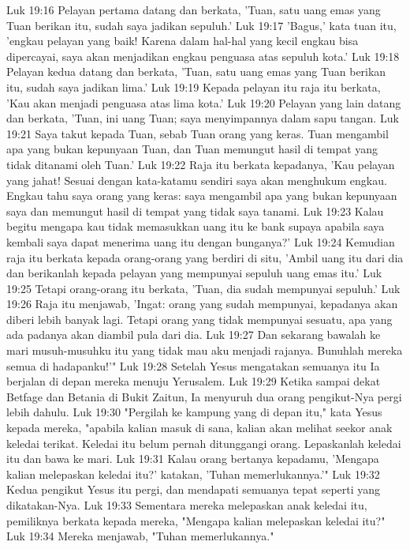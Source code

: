 Luk 19:16  Pelayan pertama datang dan berkata, 'Tuan, satu uang emas yang Tuan berikan itu, sudah saya jadikan sepuluh.'
Luk 19:17  'Bagus,' kata tuan itu, 'engkau pelayan yang baik! Karena dalam hal-hal yang kecil engkau bisa dipercayai, saya akan menjadikan engkau penguasa atas sepuluh kota.'
Luk 19:18  Pelayan kedua datang dan berkata, 'Tuan, satu uang emas yang Tuan berikan itu, sudah saya jadikan lima.'
Luk 19:19  Kepada pelayan itu raja itu berkata, 'Kau akan menjadi penguasa atas lima kota.'
Luk 19:20  Pelayan yang lain datang dan berkata, 'Tuan, ini uang Tuan; saya menyimpannya dalam sapu tangan.
Luk 19:21  Saya takut kepada Tuan, sebab Tuan orang yang keras. Tuan mengambil apa yang bukan kepunyaan Tuan, dan Tuan memungut hasil di tempat yang tidak ditanami oleh Tuan.'
Luk 19:22  Raja itu berkata kepadanya, 'Kau pelayan yang jahat! Sesuai dengan kata-katamu sendiri saya akan menghukum engkau. Engkau tahu saya orang yang keras: saya mengambil apa yang bukan kepunyaan saya dan memungut hasil di tempat yang tidak saya tanami.
Luk 19:23  Kalau begitu mengapa kau tidak memasukkan uang itu ke bank supaya apabila saya kembali saya dapat menerima uang itu dengan bunganya?'
Luk 19:24  Kemudian raja itu berkata kepada orang-orang yang berdiri di situ, 'Ambil uang itu dari dia dan berikanlah kepada pelayan yang mempunyai sepuluh uang emas itu.'
Luk 19:25  Tetapi orang-orang itu berkata, 'Tuan, dia sudah mempunyai sepuluh.'
Luk 19:26  Raja itu menjawab, 'Ingat: orang yang sudah mempunyai, kepadanya akan diberi lebih banyak lagi. Tetapi orang yang tidak mempunyai sesuatu, apa yang ada padanya akan diambil pula dari dia.
Luk 19:27  Dan sekarang bawalah ke mari musuh-musuhku itu yang tidak mau aku menjadi rajanya. Bunuhlah mereka semua di hadapanku!'"
Luk 19:28  Setelah Yesus mengatakan semuanya itu Ia berjalan di depan mereka menuju Yerusalem.
Luk 19:29  Ketika sampai dekat Betfage dan Betania di Bukit Zaitun, Ia menyuruh dua orang pengikut-Nya pergi lebih dahulu.
Luk 19:30  "Pergilah ke kampung yang di depan itu," kata Yesus kepada mereka, "apabila kalian masuk di sana, kalian akan melihat seekor anak keledai terikat. Keledai itu belum pernah ditunggangi orang. Lepaskanlah keledai itu dan bawa ke mari.
Luk 19:31  Kalau orang bertanya kepadamu, 'Mengapa kalian melepaskan keledai itu?' katakan, 'Tuhan memerlukannya.'"
Luk 19:32  Kedua pengikut Yesus itu pergi, dan mendapati semuanya tepat seperti yang dikatakan-Nya.
Luk 19:33  Sementara mereka melepaskan anak keledai itu, pemiliknya berkata kepada mereka, "Mengapa kalian melepaskan keledai itu?"
Luk 19:34  Mereka menjawab, "Tuhan memerlukannya."
